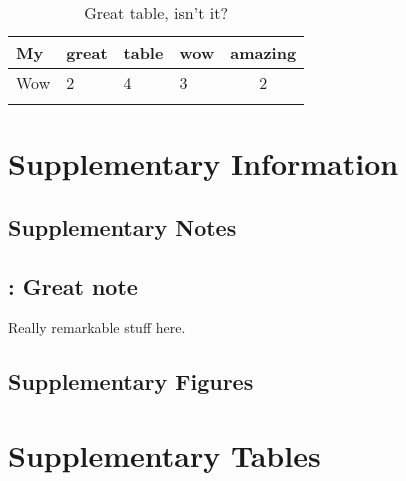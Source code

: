 \clearpage

\begin{table}
\begin{center}
  \caption{\label{tab:description} Great table, isn't it?}
  \begin{tabular}{ llllc }
    \Xhline{2pt}
    My & great & table & wow & amazing\\
    \hline
    Wow & 2 & 4 & 3 & 2\\
    \Xhline{2pt}
  \end{tabular}
\end{center}
\end{table}

\clearpage


\section*{Supplementary Information}

\subsection*{Supplementary Notes}

\subsection*{: Great note}

Really remarkable stuff here.


\subsection*{Supplementary Figures}

\clearpage

\begin{sfigure}[htbp]
  \centering
  
\end{sfigure}

\clearpage

\begin{sfigure}[htbp]
  \centering
  {\label{sfig:okay}}
  {\label{sfig:maybe}}
  {\label{sfig:alright}}
  \caption{, This describes so many cool
    things. , This is okay. , This is
    meh. , This is alright.}
  \label{sfig:itsokay}
\end{sfigure}

\clearpage

\section*{Supplementary Tables}

